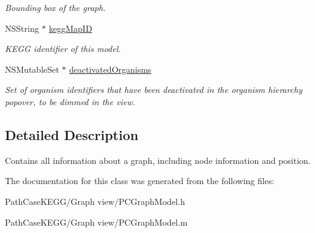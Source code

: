 \begin{DoxyCompactItemize}
\begin{DoxyCompactList}\small\item\em Bounding box of the graph. \end{DoxyCompactList}\item 
\hypertarget{interface_p_c_graph_model_af59058256d30a2678ddaa2051f7c1b09}{
NSString $\ast$ \hyperlink{interface_p_c_graph_model_af59058256d30a2678ddaa2051f7c1b09}{keggMapID}}
\label{interface_p_c_graph_model_af59058256d30a2678ddaa2051f7c1b09}

\begin{DoxyCompactList}\small\item\em KEGG identifier of this model. \end{DoxyCompactList}\item 
\hypertarget{interface_p_c_graph_model_a696ba0f8bafe61b7dad69a42cfa73579}{
NSMutableSet $\ast$ \hyperlink{interface_p_c_graph_model_a696ba0f8bafe61b7dad69a42cfa73579}{deactivatedOrganisms}}
\label{interface_p_c_graph_model_a696ba0f8bafe61b7dad69a42cfa73579}

\begin{DoxyCompactList}\small\item\em Set of organism identifiers that have been deactivated in the organism hierarchy popover, to be dimmed in the view. \end{DoxyCompactList}\end{DoxyCompactItemize}


\subsection{Detailed Description}
Contains all information about a graph, including node information and position. 

The documentation for this class was generated from the following files:\begin{DoxyCompactItemize}
\item 
PathCaseKEGG/Graph view/PCGraphModel.h\item 
PathCaseKEGG/Graph view/PCGraphModel.m\end{DoxyCompactItemize}
